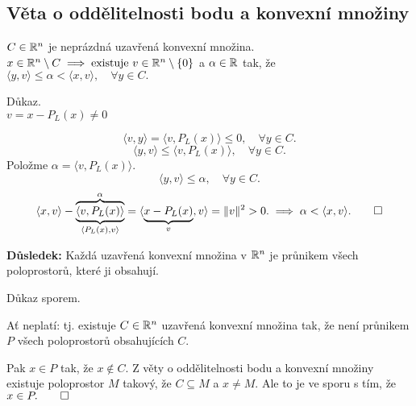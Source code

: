 \subsection{Věta o oddělitelnosti bodu a konvexní množiny} \label{oddel}
\begin{multicols}{2}

\columnbreak
    \hspace*{-2cm}
    $C \in \mathbb{R}^n$ je neprázdná uzavřená konvexní množina.
    \\
    \hspace*{-2cm}
    $x \in \mathbb{R}^n \setminus C \implies \text{existuje } v \in \mathbb{R}^n \setminus \left\lbrace 0 \right\rbrace$ a $\alpha \in \mathbb{R}$ tak, že
    \\
    $\langle y, v\rangle \leq \alpha < \langle x, v\rangle, \quad \forall y \in C.$
\end{multicols}
Důkaz.\\
$v = x - P_L (x) \not=0$

\[
    \langle v, y\rangle = \langle v, P_L(x)\rangle \leq 0, \quad \forall y \in C.
\]
\[
    \langle y, v\rangle \leq \langle v, P_L (x)\rangle, \quad \forall y \in C.
\]
Položme $\alpha = \langle v, P_L (x)\rangle$.
\[
    \langle y, v\rangle \leq \alpha, \quad \forall y \in C.
\]
\[
    \langle x, v\rangle - \underbrace{\overbrace{\langle v, P_L (x)\rangle}^{\alpha}}_{\langle P_L(x), v\rangle} = 
    \langle \underbrace{x - P_L (x)}_{v}, v\rangle = \| v\|^2 > 0. \implies \alpha < \langle x, v\rangle. \qed
\]

\textbf{Důsledek:} Každá uzavřená konvexní množina v $\mathbb{R}^n$ je průnikem všech poloprostorů, které ji obsahují.

Důkaz sporem.

Ať neplatí: tj. existuje $C \in \mathbb{R}^n$ uzavřená konvexní množina tak, že není průnikem $P$ všech poloprostorů 
obsahujících $C$.

Pak $x \in P$ tak, že $x \not\in C$. Z věty o oddělitelnosti bodu a konvexní množiny existuje poloprostor $M$ takový,
že $C \subseteq M$ a $x \not= M$. Ale to je ve sporu s tím, že $x \in P. \qed$


